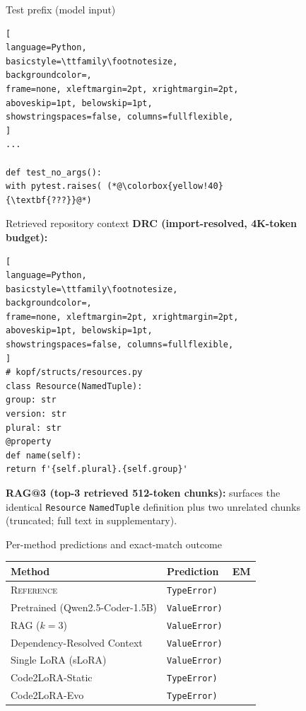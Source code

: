\documentclass{llmxive}
\providecommand{\codelora}{Code2LoRA\xspace}
\providecommand{\codelorastatic}{\codelora-Static\xspace}
\providecommand{\codeloraevo}{\codelora-Evo\xspace}
\begin{document}
\begin{figure}[!htbp]
\begin{center}
\begin{tcolorbox}
\begin{qexsection}{Test prefix (model input)}
\begin{lstlisting}[
language=Python,
basicstyle=\ttfamily\footnotesize,
backgroundcolor=,
frame=none, xleftmargin=2pt, xrightmargin=2pt,
aboveskip=1pt, belowskip=1pt,
showstringspaces=false, columns=fullflexible,
]
...

def test_no_args():
with pytest.raises( (*@\colorbox{yellow!40}{\textbf{???}}@*)
\end{lstlisting}
\end{qexsection}

\begin{qexsection}{Retrieved repository context}
\textbf{\footnotesize DRC (import-resolved, 4K-token budget):}
\begin{lstlisting}[
language=Python,
basicstyle=\ttfamily\footnotesize,
backgroundcolor=,
frame=none, xleftmargin=2pt, xrightmargin=2pt,
aboveskip=1pt, belowskip=1pt,
showstringspaces=false, columns=fullflexible,
]
# kopf/structs/resources.py
class Resource(NamedTuple):
group: str
version: str
plural: str
@property
def name(self):
return f'{self.plural}.{self.group}'
\end{lstlisting}
\textbf{\footnotesize RAG@3 (top-3 retrieved 512-token chunks):} surfaces the identical \texttt{Resource} \texttt{NamedTuple} definition plus two unrelated chunks (truncated; full text in supplementary).
\end{qexsection}

\begin{qexsection}{Per-method predictions and exact-match outcome}
\footnotesize
\setlength{\tabcolsep}{6pt}
\begin{tabular}{@{}llc@{}}
\toprule
Method & Prediction & EM \\
\midrule
\textsc{Reference}                            & \texttt{TypeError)}    & \\
\midrule
Pretrained (Qwen2.5-Coder-1.5B)               & \texttt{ValueError)}   &  \\
RAG ($k\!=\!3$)                               & \texttt{ValueError)}   &  \\
Dependency-Resolved Context                   & \texttt{ValueError)}   &  \\
Single LoRA (sLoRA)                           & \texttt{ValueError)}   &  \\
\midrule
\codelorastatic{}                 & \texttt{TypeError)}    &  \\
\codeloraevo{}                                 & \texttt{TypeError)}    &  \\
\bottomrule
\end{tabular}
\end{qexsection}


\end{tcolorbox}
\end{center}
\end{figure}
\end{document}
